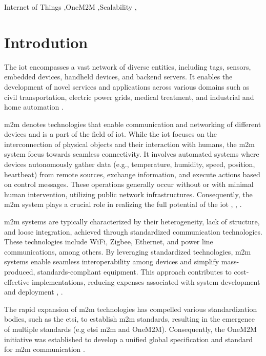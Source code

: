 \documentclass[a4paper,fleqn]{cas-dc}
\begin{document}
\begin{keywords}
Internet of Things \sep OneM2M \sep Scalability \sep 
\end{keywords}


\maketitle

\section{Introdution}

The \gls{iot} encompasses a vast network of diverse entities, including tags, sensors, embedded devices, handheld devices, and backend servers. It enables the development of novel services and applications across various domains such as civil transportation, electric power grids, medical treatment, and industrial and home automation \cite{kim_m2m_2014}. 

\gls{m2m} denotes technologies that enable communication and networking of different devices and is a part of the field of \gls{iot}. While the \gls{iot} focuses on the interconnection of physical objects and their interaction with humans, the \gls{m2m} system focus towards seamless connectivity. It involves automated systems where devices autonomously gather data (e.g., temperature, humidity, speed, position, heartbeat) from remote sources, exchange information, and execute actions based on control messages. These operations generally occur without or with minimal human intervention, utilizing public network infrastructures. Consequently, the \gls{m2m} system plays a crucial role in realizing the full potential of the \gls{iot} \cite{kim_m2m_2014}, \cite{lawton_machine_2004}, \cite{pticek_architecture_2015}.

\gls{m2m} systems are typically characterized by their heterogeneity, lack of structure, and loose integration, achieved through standardized communication technologies. These technologies include WiFi, Zigbee, Ethernet, and power line communications, among others. By leveraging standardized technologies, \gls{m2m} systems enable seamless interoperability among devices and simplify mass-produced, standards-compliant equipment. This approach contributes to cost-effective implementations, reducing expenses associated with system development and deployment \cite{lawton_machine_2004}, \cite{cao_survey_2016}.

The rapid expansion of \gls{m2m} technologies has compelled various standardization bodies, such as the \gls{etsi}, to establish \gls{m2m} standards, resulting in the emergence of multiple standards (e.g \gls{etsi} \gls{m2m} and OneM2M). Consequently, the OneM2M initiative was established to develop a unified global specification and standard for \gls{m2m} communication \cite{pticek_architecture_2015}.
\end{document}
